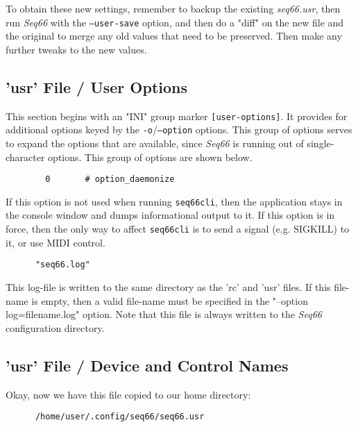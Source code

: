    To obtain these new settings, remember to backup the existing
   \textsl{seq66.usr}, then run \textsl{Seq66} with the
   \texttt{--user-save} option, and then do a "diff" on the new file and the
   original to merge any old values that need to be preserved.  Then make any
   further tweaks to the new values.

\subsection{'usr' File / User Options}
\label{subsec:usr_file_user_options}

   This section begins with an
   "INI" group marker \texttt{[user-options]}.
   It provides for additional options keyed by the
   \texttt{-o}/\texttt{--option} options.
   This group of options serves to expand the options that are available, since
   \textsl{Seq66} is  running out of single-character options.
   This group of options are shown below.

   \begin{verbatim}
		0       # option_daemonize
   \end{verbatim}

   If this option is not used when running \texttt{seq66cli}, then the
   application stays in the console window and dumps informational output to
   it.  If this option is in force, then the only way to affect
   \texttt{seq66cli} is to send a signal (e.g. SIGKILL) to it, or use
   MIDI control.

   \begin{verbatim}
      "seq66.log"
   \end{verbatim}

   This log-file is written to the same directory as the 'rc' and 'usr' files.
   If this file-name is empty, then a valid file-name must be specified
   in the "--option log=filename.log" option.  Note that this file
   is always written to the \textsl{Seq66} configuration directory.

\subsection{'usr' File / Device and Control Names}
\label{subsec:usr_file_midi_bus_results}

   Okay, now we have this file copied to our home directory:

   \begin{verbatim}
      /home/user/.config/seq66/seq66.usr
   \end{verbatim}

